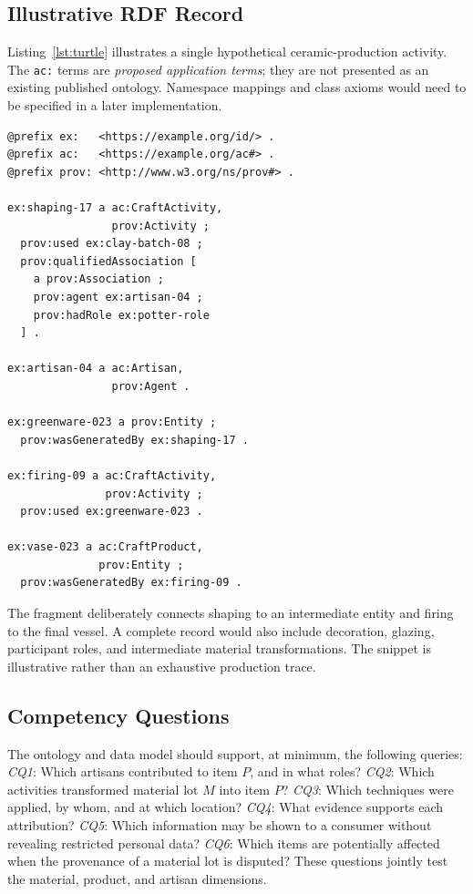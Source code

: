\documentclass[conference]{IEEEtran}
\begin{document}
\subsection{Illustrative RDF Record}
Listing~\ref{lst:turtle} illustrates a single hypothetical ceramic-production activity. The \texttt{ac:} terms are \emph{proposed application terms}; they are not presented as an existing published ontology. Namespace mappings and class axioms would need to be specified in a later implementation.

\begin{lstlisting}[caption={Illustrative Turtle fragment, not a deployed dataset.},label={lst:turtle}]
@prefix ex:   <https://example.org/id/> .
@prefix ac:   <https://example.org/ac#> .
@prefix prov: <http://www.w3.org/ns/prov#> .

ex:shaping-17 a ac:CraftActivity,
                prov:Activity ;
  prov:used ex:clay-batch-08 ;
  prov:qualifiedAssociation [
    a prov:Association ;
    prov:agent ex:artisan-04 ;
    prov:hadRole ex:potter-role
  ] .

ex:artisan-04 a ac:Artisan,
                prov:Agent .

ex:greenware-023 a prov:Entity ;
  prov:wasGeneratedBy ex:shaping-17 .

ex:firing-09 a ac:CraftActivity,
               prov:Activity ;
  prov:used ex:greenware-023 .

ex:vase-023 a ac:CraftProduct,
              prov:Entity ;
  prov:wasGeneratedBy ex:firing-09 .
\end{lstlisting}

The fragment deliberately connects shaping to an intermediate entity and firing to the final vessel. A complete record would also include decoration, glazing, participant roles, and intermediate material transformations. The snippet is illustrative rather than an exhaustive production trace.

\subsection{Competency Questions}
The ontology and data model should support, at minimum, the following queries: \emph{CQ1}: Which artisans contributed to item $P$, and in what roles? \emph{CQ2}: Which activities transformed material lot $M$ into item $P$? \emph{CQ3}: Which techniques were applied, by whom, and at which location? \emph{CQ4}: What evidence supports each attribution? \emph{CQ5}: Which information may be shown to a consumer without revealing restricted personal data? \emph{CQ6}: Which items are potentially affected when the provenance of a material lot is disputed? These questions jointly test the material, product, and artisan dimensions.
\end{document}
